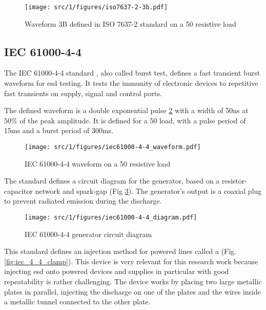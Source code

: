 \begin{figure}[!h]
  \centering
  \texttt{[image: src/1/figures/iso7637-2-3b.pdf]}
  \caption{Waveform 3B defined in ISO 7637-2 standard on a 50\textOmega{} resistive load}
  \label{fig:iso_2b_pulse}
\end{figure}

\subsection{IEC 61000-4-4}

The IEC 61000-4-4 standard \cite{iec61000-4-4}, also called burst test, defines a fast transient burst waveform for \gls{esd} testing.
It tests the immunity of electronic devices to repetitive fast transients on supply, signal and control ports.

The defined waveform is a double exponential pulse \ref{fig:iec_4_4_pulse} with a width of 50ns at 50\% of the peak amplitude.
It is defined for a 50\textOmega{} load, with a pulse period of 15ms and a burst period of 300ms.

\begin{figure}[!h]
  \centering
  \texttt{[image: src/1/figures/iec61000-4-4\_waveform.pdf]}
  \caption{IEC 61000-4-4 waveform on a 50\textOmega{} resistive load}
  \label{fig:iec_4_4_pulse}
\end{figure}

The standard defines a circuit diagram for the generator, based on a resistor-capacitor network and spark-gap (Fig \ref{fig:iec_4_4_generator}).
The generator's output is a coaxial plug to prevent radiated emission during the discharge.

\begin{figure}[!h]
  \centering
  \texttt{[image: src/1/figures/iec61000-4-4\_diagram.pdf]}
  \caption{IEC 61000-4-4 generator circuit diagram}
  \label{fig:iec_4_4_generator}
\end{figure}

This standard defines an injection method for powered lines called a  (Fig. \ref{fig:iec_4_4_clamp}).
This device is very relevant for this research work because injecting \gls{esd} onto powered devices and supplies in particular with good repeatability is rather challenging.
The device works by placing two large metallic plates in parallel, injecting the discharge on one of the plates and the wires inside a metallic tunnel connected to the other plate.

